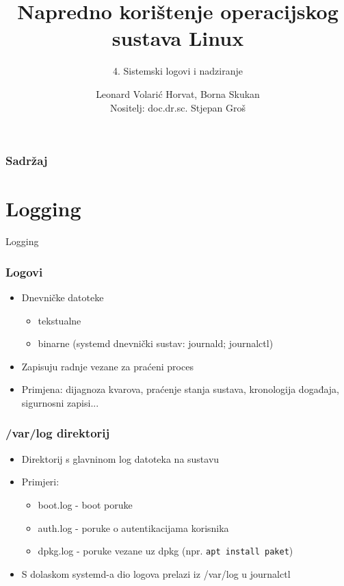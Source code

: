 \documentclass[t,table,usenames,dvipsnames]{beamer}
\date{\todayiso}
\title[NKOSL]{Napredno korištenje operacijskog sustava Linux}
\author[Leonard Volarić Horvat, Borna Skukan]{Leonard Volarić Horvat, Borna Skukan\\{\small Nositelj: doc.dr.sc. Stjepan Groš}}
\subtitle{4. Sistemski logovi i nadziranje}
\institute[FER]{Sveučilište u Zagrebu\\Fakultet elektrotehnike i računarstva}
\newcommand{\shell}[1]{\texttt{#1}}
\begin{document}
{
	\begin{frame}
		\maketitle
	\end{frame}
}

\begin{frame}
    \frametitle{Sadržaj}
    \tableofcontents
\end{frame}

\section{Logging}

\begin{frame}
    \vspace*{\fill}
        \begin{center}
            \Huge{Logging}
        \end{center}
    \vspace*{\fill}
\end{frame}


\begin{frame}
    \frametitle{Logovi}
    \begin{itemize}
        \item Dnevničke datoteke 
        \begin{itemize}
            \item tekstualne
            \item binarne (systemd dnevnički sustav: journald; journalctl)
        \end{itemize}
        \item Zapisuju radnje vezane za praćeni proces
        \item Primjena: dijagnoza kvarova, praćenje stanja sustava, kronologija događaja, sigurnosni zapisi...
    \end{itemize}
\end{frame}



\begin{frame}
    \frametitle{/var/log direktorij}
    \begin{itemize}
        \item Direktorij s glavninom log datoteka na sustavu
        \item Primjeri:
        \begin{itemize}
            \item boot.log - boot poruke
            \item auth.log - poruke o autentikacijama korisnika
            \item dpkg.log - poruke vezane uz dpkg (npr. \shell{apt install paket})
        \end{itemize}
        \item S dolaskom systemd-a dio logova prelazi iz /var/log u journalctl
    \end{itemize}
\end{frame}
\end{document}
